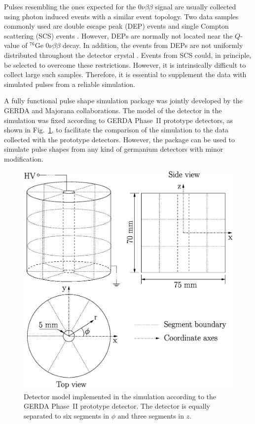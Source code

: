 \documentclass[epj,referee]{svjour}
\begin{document}
Pulses resembling the ones expected for the $0\nu\beta\beta$ signal
are usually collected using photon induced events with a similar event
topology. Two data samples commonly used are double escape peak (DEP)
events and single Compton scattering (SCS) events \cite{scs}.
However, DEPs are normally not located near the $Q$-value of $^{76}$Ge
$0\nu\beta\beta$ decay. In addition, the events from DEPs are not
uniformly distributed throughout the detector crystal
\cite{psam}. Events from SCS could, in principle, be selected to
overcome these restrictions. However, it is intrinsically difficult to
collect large such samples. Therefore, it is essential to supplement
the data with simulated pulses from a reliable simulation.

A fully functional pulse shape simulation package was jointly
developed by the GERDA and Majorana \cite{Gai03,Aal04}
collaborations. The model of the detector in the simulation was fixed
according to GERDA Phase~II prototype detectors, as shown in
Fig.~\ref{f:model}, to facilitate the comparison of the simulation to
the data collected with the prototype detectors. However, the package
can be used to simulate pulse shapes from any kind of germanium
detectors with minor modification.

\begin{figure}[htbp]
\centering
\includegraphics[width=0.85\linewidth]{model}
\caption{Detector model implemented in the simulation according to the
GERDA Phase~II prototype detector. The detector is equally separated
to six segments in $\phi$ and three segments in $z$.}
\label{f:model}
\end{figure}
\end{document}
